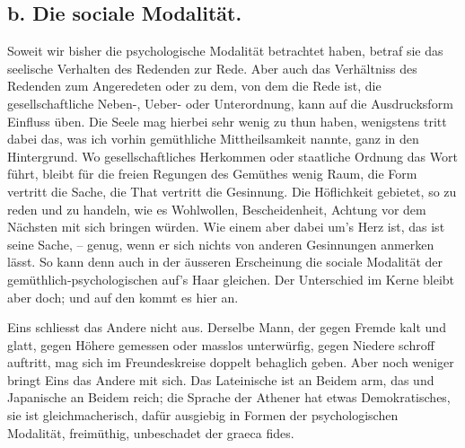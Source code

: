 \subsection*{b. Die sociale Modalität.}\label{IV.IV.IIb}

\largerpage[-1]Soweit wir bisher die psychologische Modalität betrachtet haben, betraf sie das seelische Verhalten des Redenden zur Rede. Aber auch das Verhältniss des Redenden zum Angeredeten oder zu dem, von dem die Rede ist, die gesellschaftliche Neben-, Ueber- oder Unterordnung, kann auf die Ausdrucksform  Einfluss üben. Die Seele mag hierbei sehr wenig zu thun haben, wenigstens tritt dabei das, was ich vorhin gemüthliche Mittheilsamkeit nannte, ganz in den Hintergrund. Wo gesellschaftliches Herkommen oder staatliche Ordnung das Wort führt, bleibt für die freien Regungen des Gemüthes wenig Raum, die \label{fp.456} Form vertritt die Sache, die That vertritt die Gesinnung. Die Höflichkeit gebietet, so zu reden und zu handeln, wie es Wohlwollen, Bescheidenheit, Achtung vor dem Nächsten mit sich bringen würden. Wie einem aber dabei um’s Herz ist, das ist seine Sache, – genug, wenn er sich nichts von anderen Gesinnungen anmerken lässt. So kann denn auch in der äusseren Erscheinung die sociale Modalität der gemüthlich-psychologischen auf’s Haar gleichen. Der Unterschied im Kerne bleibt aber doch; und auf den kommt es hier an.

Eins schliesst das Andere nicht aus. Derselbe Mann, der gegen Fremde kalt und glatt, gegen Höhere gemessen oder masslos unterwürfig, gegen Niedere schroff auftritt, mag sich im Freundeskreise doppelt behaglich geben. Aber noch weniger bringt Eins das Andere mit sich. Das Lateinische ist an Beidem arm, das  und Japanische an Beidem reich; die Sprache der Athener hat etwas Demokratisches, sie ist gleichmacherisch, dafür ausgiebig in Formen der psychologischen Modalität, freimüthig, unbeschadet der graeca fides.

